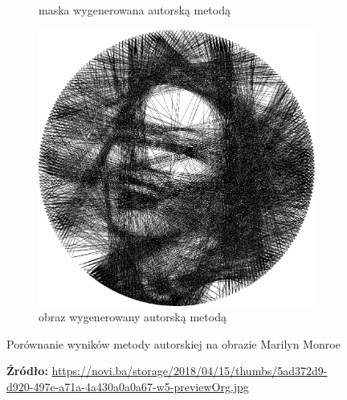 \documentclass[a4paper, 12pt, polish, twoside]{extreport}
\begin{document}
\begin{figure}[H]
\begin{subfigure}{0.40\textwidth}
        \caption{maska wygenerowana autorską metodą}
        \label{comp-comp-monroe-c}
    \end{subfigure}
    \begin{subfigure}{0.40\textwidth}
        \centering
        \includegraphics[width = \textwidth]{img/6-comp/monroe-portrait_e_i2000_c20_inv0_bg10_obj1_ed1.png}
        \caption{obraz wygenerowany autorską metodą}
        \label{comp-comp-monroe-d}
    \end{subfigure}
    \caption{Porównanie wyników metody autorskiej na obrazie Marilyn Monroe}
    \caption*{\footnotesize{\textbf{Źródło:} {\url{https://novi.ba/storage/2018/04/15/thumbs/5ad372d9-d920-497e-a71a-4a430a0a0a67-w5-previewOrg.jpg}}}}
    \label{comp-comp-monroe}
    \end{figure}
    
\end{document}
